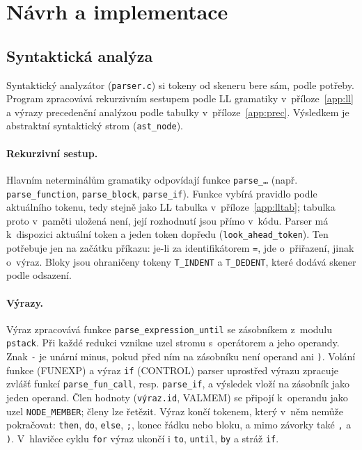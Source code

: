 \documentclass[11pt,a4paper]{article}
\begin{document}
\section{Návrh a implementace}



\subsection{Syntaktická analýza}
Syntaktický analyzátor (\texttt{parser.c}) si tokeny od skeneru bere sám,
podle potřeby. Program zpracovává rekurzivním sestupem podle LL gramatiky v~příloze~\ref{app:ll}
a výrazy precedenční analýzou podle tabulky v~příloze~\ref{app:prec}.
Výsledkem je abstraktní syntaktický strom (\texttt{ast\_node}).

\paragraph{Rekurzivní sestup.}
Hlavním neterminálům gramatiky odpovídají funkce \texttt{parse\_\dots}
(např. \texttt{parse\_function}, \texttt{parse\_block},
\texttt{parse\_if}). Funkce vybírá pravidlo podle aktuálního tokenu, tedy
stejně jako LL tabulka v~příloze~\ref{app:lltab}; tabulka proto v~paměti
uložená není, její rozhodnutí jsou přímo v~kódu. Parser má k~dispozici
aktuální token a jeden token dopředu (\texttt{look\_ahead\_token}). Ten
potřebuje jen na začátku příkazu: je-li za identifikátorem \texttt{=},
jde o~přiřazení, jinak o~výraz. Bloky jsou ohraničeny tokeny
\texttt{T\_INDENT} a \texttt{T\_DEDENT}, které dodává skener podle
odsazení.

\paragraph{Výrazy.}
Výraz zpracovává funkce \texttt{parse\_expression\_until} se
zásobníkem z~modulu \texttt{pstack}. Při každé redukci vznikne uzel stromu
s~operátorem a jeho operandy. Znak \texttt{-} je unární minus, pokud před
ním na zásobníku není operand ani \texttt{)}. Volání funkce (FUNEXP)
a výraz \texttt{if} (CONTROL) parser uprostřed výrazu zpracuje zvlášť
funkcí \texttt{parse\_fun\_call}, resp. \texttt{parse\_if}, a výsledek
vloží na zásobník jako jeden operand. Člen hodnoty (\texttt{výraz.id},
VALMEM) se připojí k~operandu jako uzel \texttt{NODE\_MEMBER}; členy lze
řetězit. Výraz končí tokenem, který v~něm nemůže pokračovat:
\texttt{then}, \texttt{do}, \texttt{else}, \texttt{;}, konec řádku nebo
bloku, a mimo závorky také \texttt{,} a \texttt{)}. V~hlavičce cyklu
\texttt{for} výraz ukončí i \texttt{to}, \texttt{until}, \texttt{by}
a stráž \texttt{if}.
\end{document}
